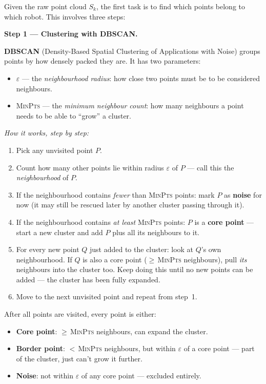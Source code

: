 \documentclass[12pt, a4paper]{article}
\begin{document}
Given the raw point cloud $S_k$, the first task is to find which points
belong to which robot.
This involves three steps:

\textbf{Step 1 --- Clustering with DBSCAN.}

\textbf{DBSCAN} (Density-Based Spatial Clustering of Applications with
Noise) groups points by how densely packed they are.
It has two parameters:
\begin{itemize}[leftmargin=1.2em,itemsep=2pt]
  \item $\varepsilon$ --- the \emph{neighbourhood radius}: how close two
    points must be to be considered neighbours.
  \item \textsc{MinPts} --- the \emph{minimum neighbour count}: how many
    neighbours a point needs to be able to ``grow'' a cluster.
\end{itemize}

\textit{How it works, step by step:}
\begin{enumerate}[leftmargin=1.6em,itemsep=3pt]
  \item Pick any unvisited point $P$.
  \item Count how many other points lie within radius $\varepsilon$ of
    $P$ --- call this the \emph{neighbourhood} of $P$.
  \item If the neighbourhood contains \emph{fewer} than \textsc{MinPts}
    points: mark $P$ as \textbf{noise} for now (it may still be rescued
    later by another cluster passing through it).
  \item If the neighbourhood contains \emph{at least} \textsc{MinPts}
    points: $P$ is a \textbf{core point} --- start a new cluster and
    add $P$ plus all its neighbours to it.
  \item For every new point $Q$ just added to the cluster: look at
    $Q$'s own neighbourhood.
    If $Q$ is also a core point ($\geq$\,\textsc{MinPts} neighbours),
    pull \emph{its} neighbours into the cluster too.
    Keep doing this until no new points can be added --- the cluster
    has been fully expanded.
  \item Move to the next unvisited point and repeat from step~1.
\end{enumerate}

After all points are visited, every point is either:
\begin{itemize}[leftmargin=1.2em,itemsep=2pt]
  \item \textbf{Core point}: $\geq$\,\textsc{MinPts} neighbours, can expand
    the cluster.
  \item \textbf{Border point}: $<$\,\textsc{MinPts} neighbours, but
    within $\varepsilon$ of a core point --- part of the cluster, just
    can't grow it further.
  \item \textbf{Noise}: not within $\varepsilon$ of any core point ---
    excluded entirely.
\end{itemize}
\end{document}
